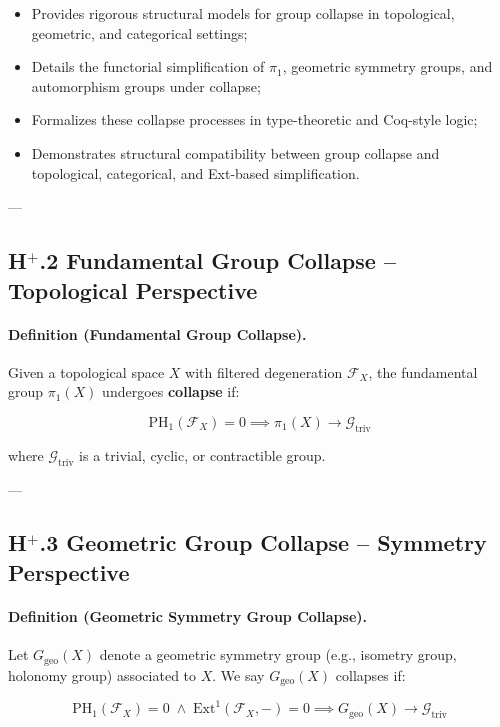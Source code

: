 \documentclass[11pt]{article}
\begin{document}
\begin{itemize}
    \item Provides rigorous structural models for group collapse in topological, geometric, and categorical settings;
    \item Details the functorial simplification of $\pi_1$, geometric symmetry groups, and automorphism groups under collapse;
    \item Formalizes these collapse processes in type-theoretic and Coq-style logic;
    \item Demonstrates structural compatibility between group collapse and topological, categorical, and Ext-based simplification.
\end{itemize}

---

\subsection*{H$^{+}$.2 Fundamental Group Collapse – Topological Perspective}

\paragraph{Definition (Fundamental Group Collapse).}

Given a topological space $X$ with filtered degeneration $\mathcal{F}_X$, the fundamental group $\pi_1(X)$ undergoes \textbf{collapse} if:

\[
\mathrm{PH}_1(\mathcal{F}_X) = 0 \implies \pi_1(X) \longrightarrow \mathcal{G}_{\mathrm{triv}}
\]

where $\mathcal{G}_{\mathrm{triv}}$ is a trivial, cyclic, or contractible group.

---

\subsection*{H$^{+}$.3 Geometric Group Collapse – Symmetry Perspective}

\paragraph{Definition (Geometric Symmetry Group Collapse).}

Let $G_{\mathrm{geo}}(X)$ denote a geometric symmetry group (e.g., isometry group, holonomy group) associated to $X$. We say $G_{\mathrm{geo}}(X)$ collapses if:

\[
\mathrm{PH}_1(\mathcal{F}_X) = 0 \;\land\; \mathrm{Ext}^1(\mathcal{F}_X, -) = 0 \implies G_{\mathrm{geo}}(X) \longrightarrow \mathcal{G}_{\mathrm{triv}}
\]
\end{document}

